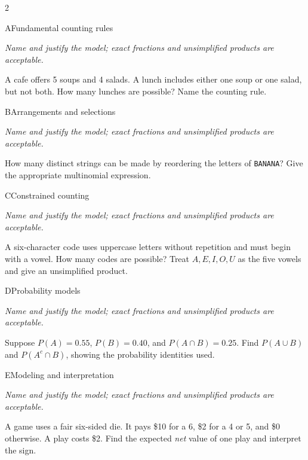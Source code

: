 \documentclass[9pt]{extarticle}
\begin{document}
\begin{multicols}{2}
\begin{CoreProblem}{A}{Fundamental counting rules}
{\scriptsize\textit{Name and justify the model; exact fractions and unsimplified products are acceptable.}\par}
A cafe offers 5 soups and 4 salads. A lunch includes either one soup
    or one salad, but not both. How many lunches are possible? Name the counting
    rule.
\end{CoreProblem}
\begin{CoreProblem}{B}{Arrangements and selections}
{\scriptsize\textit{Name and justify the model; exact fractions and unsimplified products are acceptable.}\par}
How many distinct strings can be made by reordering the letters of
    \texttt{BANANA}? Give the appropriate multinomial expression.
\end{CoreProblem}
\begin{CoreProblem}{C}{Constrained counting}
{\scriptsize\textit{Name and justify the model; exact fractions and unsimplified products are acceptable.}\par}
A six-character code uses uppercase letters without repetition and
    must begin with a vowel. How many codes are possible? Treat
    $A,E,I,O,U$ as the five vowels and give an unsimplified product.
\end{CoreProblem}
\columnbreak
\begin{CoreProblem}{D}{Probability models}
{\scriptsize\textit{Name and justify the model; exact fractions and unsimplified products are acceptable.}\par}
Suppose $P(A)=0.55$, $P(B)=0.40$, and $P(A\cap B)=0.25$. Find
    $P(A\cup B)$ and $P(A^c\cap B)$, showing the probability identities used.
\end{CoreProblem}
\begin{CoreProblem}{E}{Modeling and interpretation}
{\scriptsize\textit{Name and justify the model; exact fractions and unsimplified products are acceptable.}\par}
A game uses a fair six-sided die. It pays \$10 for a 6, \$2 for a 4
    or 5, and \$0 otherwise. A play costs \$2. Find the expected \emph{net}
    value of one play and interpret the sign.
\end{CoreProblem}
\end{multicols}
\CoreWorkArea
\FormBreak
{}
\end{document}
